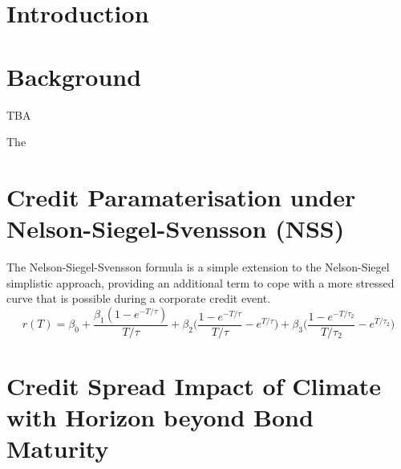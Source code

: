 \documentclass{article}
\begin{document}
\section{Introduction}

\section{Background}

TBA \par

The

\section{Credit Paramaterisation under Nelson-Siegel-Svensson (NSS)}

The Nelson-Siegel-Svensson formula is a simple extension to the Nelson-Siegel simplistic approach, providing an additional term to cope with a more stressed curve that is possible during a corporate credit event.
\begin{equation}
r(T) = \beta_0 + \displaystyle \frac{\beta_1(1-e^{-T/\tau})}{T/\tau} + \beta_2 \Bigg(\displaystyle \frac{1-e^{-T/\tau}}{T/\tau} - e^{T/\tau}\Bigg ) +  \beta_3 \Bigg(\displaystyle \frac{1-e^{-T/\tau_2}}{T/\tau_2} - e^{T/\tau_2}\Bigg )
\end{equation}


\section{Credit Spread Impact of Climate with Horizon beyond Bond Maturity} 




%
%
\end{document}
